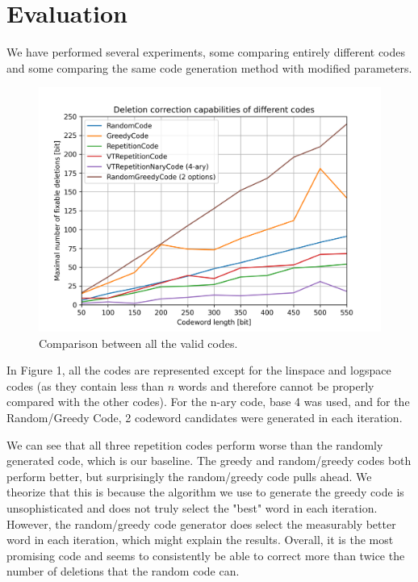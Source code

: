 \documentclass{article}
\begin{document}
\section{Evaluation}
We have performed several experiments, some comparing entirely different codes and some comparing the same code generation method with modified parameters.

\begin{figure}[H]
    \centering
    \includegraphics[width=1\textwidth]{../artifacts/figure1.png}
    \caption{Comparison between all the valid codes.}
\end{figure}

\noindent In Figure 1, all the codes are represented except for the linspace and logspace codes (as they contain less than $n$ words and therefore cannot be properly compared with the other codes). For the n-ary code, base 4 was used, and for the Random/Greedy Code, 2 codeword candidates were generated in each iteration.

We can see that all three repetition codes perform worse than the randomly generated code, which is our baseline.
The greedy and random/greedy codes both perform better, but surprisingly the random/greedy code pulls ahead. We theorize that this is because the algorithm we use to generate the greedy code is unsophisticated and does not truly select the "best" word in each iteration. However, the random/greedy code generator does select the measurably better word in each iteration, which might explain the results. Overall, it is the most promising code and seems to consistently be able to correct more than twice the number of deletions that the random code can.
\end{document}
